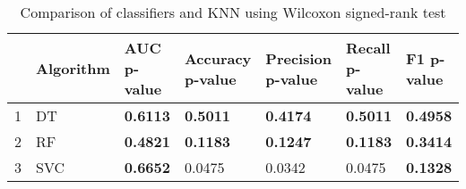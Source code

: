 \begin{table}
\footnotesize
\caption{Comparison of classifiers and KNN using Wilcoxon signed-rank test}
\label{tab:wilcoxon comparison}
\begin{tabular}{lllllll}
\hline
 & Algorithm & AUC p-value & Accuracy p-value & Precision p-value & Recall p-value & F1 p-value \\
\hline
1 & DT & \textbf{0.6113} & \textbf{0.5011} & \textbf{0.4174} & \textbf{0.5011} & \textbf{0.4958} \\
2 & RF & \textbf{0.4821} & \textbf{0.1183} & \textbf{0.1247} & \textbf{0.1183} & \textbf{0.3414} \\
3 & SVC & \textbf{0.6652} & 0.0475 & 0.0342 & 0.0475 & \textbf{0.1328} \\
\hline
\end{tabular}
\end{table}
